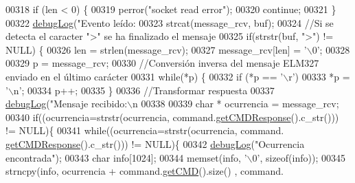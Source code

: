 \begin{DoxyCode}
{{{{{{{00318                     \textcolor{keywordflow}{if} (len < 0) \{
00319                         perror(\textcolor{stringliteral}{"socket read error"});
00320                         \textcolor{keywordflow}{continue};
00321                     \}
00322                     \hyperlink{debug_8hpp_a55f41cf7b0585224496de3d7adbc101c}{debugLog}(\textcolor{stringliteral}{"Evento leído: %
00323                     strcat(message\_rcv, buf);
00324                     \textcolor{comment}{//Si se detecta el caracter ">" se ha finalizado el mensaje}
00325                     \textcolor{keywordflow}{if}(strstr(buf, \textcolor{stringliteral}{">"}) != NULL) \{
00326                         len = strlen(message\_rcv);
00327                         message\_rcv[len] = \textcolor{charliteral}{'\(\backslash\)0'};
00328 
00329                         p = message\_rcv;
00330                         \textcolor{comment}{//Conversión inversa del mensaje ELM327 enviado en el último carácter}
00331                         \textcolor{keywordflow}{while}(*p) \{
00332                             \textcolor{keywordflow}{if} (*p == \textcolor{charliteral}{'\(\backslash\)r'})
00333                                 *p = \textcolor{charliteral}{'\(\backslash\)n'};
00334                             p++;
00335                         \}
00336                         \textcolor{comment}{//Transformar respuesta}
00337                         \hyperlink{debug_8hpp_a55f41cf7b0585224496de3d7adbc101c}{debugLog}(\textcolor{stringliteral}{"Mensaje recibido:\(\backslash\)n%
00338 
00339                         \textcolor{keywordtype}{char} * ocurrencia = message\_rcv;
00340                         \textcolor{keywordflow}{if}((ocurrencia=strstr(ocurrencia, command.\hyperlink{classCommands_ab4806a2fda5c80e10ab4446faa1e39b5}{getCMDResponse}().c\_str())) 
      != NULL)\{
00341                             \textcolor{keywordflow}{while}((ocurrencia=strstr(ocurrencia, command.
      \hyperlink{classCommands_ab4806a2fda5c80e10ab4446faa1e39b5}{getCMDResponse}().c\_str())) != NULL)\{
00342                                 \hyperlink{debug_8hpp_a55f41cf7b0585224496de3d7adbc101c}{debugLog}(\textcolor{stringliteral}{"Ocurrencia encontrada"});
00343                                 \textcolor{keywordtype}{char} info[1024];
00344                                 memset(info, \textcolor{charliteral}{'\(\backslash\)0'}, \textcolor{keyword}{sizeof}(info));
00345                                 strncpy(info, ocurrencia + command.\hyperlink{classCommands_a9aee21ab91fdfc8e9daa59e1e8f20b73}{getCMD}().size() , command.
}}}}}}}}}
\end{DoxyCode}

